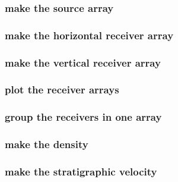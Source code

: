 \begin{frame} \frametitle{make the source array}
\end{frame}
\cwpnote{}

\begin{frame}
\end{frame}

\begin{frame} \frametitle{make the horizontal receiver array}
\end{frame}
\cwpnote{}

\begin{frame} \frametitle{make the vertical receiver array}
\end{frame}
\cwpnote{}

\begin{frame} \frametitle{plot the receiver arrays}
\end{frame}
\cwpnote{}

\begin{frame}
\end{frame}
\begin{frame}
\end{frame}

\begin{frame} \frametitle{group the receivers in one array}
\end{frame}
\cwpnote{}

\begin{frame} \frametitle{make the density}
\end{frame}
\cwpnote{}

\begin{frame}
\end{frame}

\begin{frame} \frametitle{make the stratigraphic velocity}
\end{frame}
\cwpnote{}

